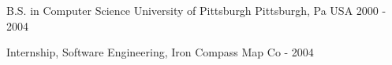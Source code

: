 \begin{cventries}
  \cventry
    {B.S. in Computer Science}
    {University of Pittsburgh}
    {Pittsburgh, Pa USA}
    {2000 - 2004}
    {
      \begin{cvitems}
       \item {Internship, Software Engineering, Iron Compass Map Co - 2004}
      \end{cvitems}
    }
\end{cventries}
